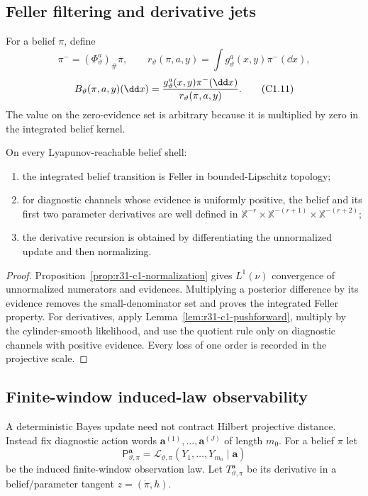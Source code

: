 \subsection{Feller filtering and derivative jets}

For a belief $\pi$, define
\[
 \pi^-=(\Phi_\vartheta^a)_\#\pi,\qquad
 r_\vartheta(\pi,a,y)=\int g_\vartheta^a(x,y)\pi^-(\dd x),              \tag{C1.10}
\]
\[
 B_\vartheta(\pi,a,y)(\dd x)
 ={g_\vartheta^a(x,y)\pi^-(\dd x)\over
   r_\vartheta(\pi,a,y)}.                                \tag{C1.11}
\]
The value on the zero-evidence set is arbitrary because it is multiplied by
zero in the integrated belief kernel.

\begin{theorem}
\label{thm:r31-c1-filter}
On every Lyapunov-reachable belief shell:

\begin{enumerate}[label=(\roman*)]
\item the integrated belief transition is Feller in bounded-Lipschitz
      topology;
\item for diagnostic channels whose evidence is uniformly positive, the
      belief and its first two parameter derivatives are well defined in
      $\mathbb X^{-r}\times\mathbb X^{-(r+1)}\times
       \mathbb X^{-(r+2)}$;
\item the derivative recursion is obtained by differentiating the
      unnormalized update and then normalizing.
\end{enumerate}
\end{theorem}

\begin{proof}
Proposition~\ref{prop:r31-c1-normalization} gives $L^1(\nu)$ convergence of
unnormalized numerators and evidences.  Multiplying a posterior difference by
its evidence removes the small-denominator set and proves the integrated
Feller property.  For derivatives, apply
Lemma~\ref{lem:r31-c1-pushforward}, multiply by the cylinder-smooth likelihood,
and use the quotient rule only on diagnostic channels with positive evidence.
Every loss of one order is recorded in the projective scale.
\end{proof}

\subsection{Finite-window induced-law observability}

A deterministic Bayes update need not contract Hilbert projective distance.
Instead fix diagnostic action words
$\mathbf a^{(1)},\ldots,\mathbf a^{(J)}$ of length $m_0$.  For a belief
$\pi$ let
\[
 \mathsf P_{\vartheta,\pi}^{\mathbf a}
 =\mathcal L_{\vartheta,\pi}
   (Y_1,\ldots,Y_{m_0}\mid\mathbf a)                       \tag{C1.12}
\]
be the induced finite-window observation law.  Let
$T_{\vartheta,\pi}^{\mathbf a}$ be its derivative in a belief/parameter
tangent $z=(\dot\pi,h)$.

